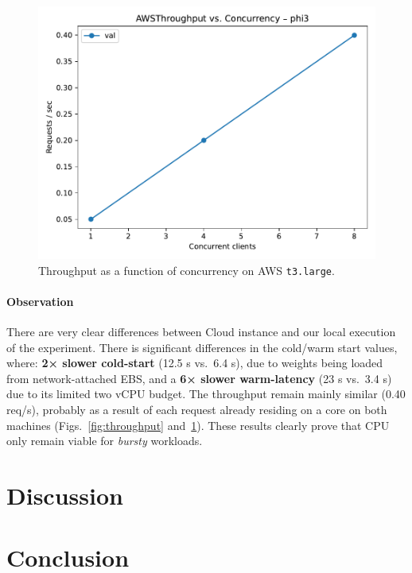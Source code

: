 \documentclass[conference]{IEEEtran}
\begin{document}
\begin{figure}[t]
  \centering
  \includegraphics[width=\linewidth]{AWSthroughput_vs_c}    
  \caption{Throughput as a function of concurrency on AWS \texttt{t3.large}.}
  \label{fig:aws_thr}
\end{figure}

\paragraph*{Observation}
There are very clear differences between Cloud instance and our local execution of the experiment. There is significant differences in the cold/warm start values, where: \textbf{2× slower cold-start}
(12.5 s vs.\ 6.4 s), due to weights being loaded from network-attached EBS, and a
\textbf{6× slower warm-latency} (23 s vs.\ 3.4 s) due to its limited two vCPU budget. The throughput remain mainly similar (0.40 req/s), probably as a result of each request already residing on a core on both machines (Figs.~\ref{fig:throughput}
and~\ref{fig:aws_thr}). These results clearly prove that CPU only remain viable for \emph{bursty} workloads. 

\section{Discussion}\label{sec:discussion}


\section{Conclusion}\label{sec:conclusion}




\end{document}
